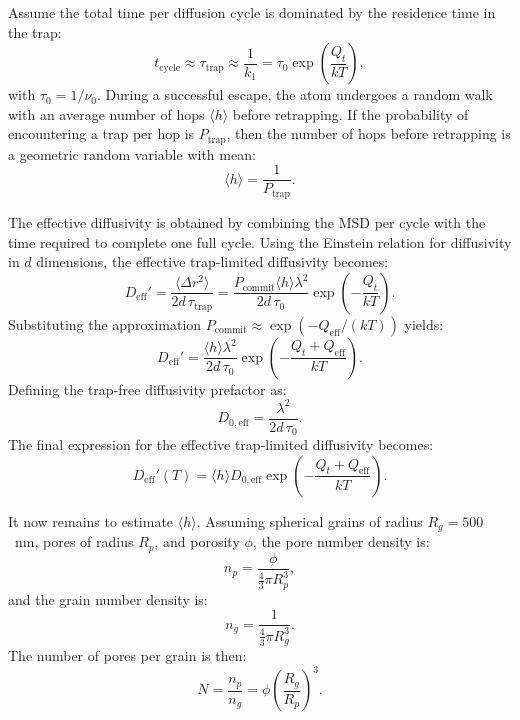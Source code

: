 \documentclass[%
preprint,
amsmath,amssymb,
aps,
]{revtex4-2}
\newcommand{\?}{\stackrel{?}{=}}
\begin{document}
Assume the total time per diffusion cycle is dominated by the residence time in the trap:
\begin{equation}
t_{\text{cycle}} \approx \tau_{\text{trap}} \approx \frac{1}{k_1} = \tau_0 \exp\left( \frac{Q_t}{kT} \right),
\end{equation}
with $\tau_0 = 1/\nu_0$. During a successful escape, the atom undergoes a random walk with an average number of hops $\langle h \rangle$ before retrapping. If the probability of encountering a trap per hop is $P_\text{trap}$, then the number of hops before retrapping is a geometric random variable \cite{Steyer2017} with mean:
\begin{equation}
\langle h \rangle = \frac{1}{P_\text{trap}}.
\end{equation}

The effective diffusivity is obtained by combining the MSD per cycle with the time required to complete one full cycle. Using the Einstein relation for diffusivity in $d$ dimensions, the effective trap-limited diffusivity becomes:
\begin{equation}
D_{\text{eff}}' = \frac{\langle \Delta r^2 \rangle}{2d \, \tau_{\text{trap}}} = \frac{P_{\text{commit}} \langle h \rangle \lambda^2}{2d \, \tau_0} \exp\left( -\frac{Q_t}{kT} \right).
\end{equation}
Substituting the approximation $P_{\text{commit}} \approx \exp(-Q_{\text{eff}} / (kT))$ yields:
\begin{equation}
D_{\text{eff}}' = \frac{\langle h \rangle \lambda^2}{2d \, \tau_0} \exp\left( -\frac{Q_t + Q_{\text{eff}}}{kT} \right).
\end{equation}
Defining the trap-free diffusivity prefactor as:
\begin{equation}
D_{0,\text{eff}} = \frac{\lambda^2}{2d \, \tau_0}.
\end{equation}
The final expression for the effective trap-limited diffusivity becomes:
\begin{equation}
D_{\text{eff}}'(T) = \langle h \rangle D_{0,\text{eff}} \exp\left( -\frac{Q_t + Q_{\text{eff}}}{kT} \right).
\end{equation}

It now remains to estimate $\langle h \rangle$. Assuming spherical grains of radius $R_g = 500$~nm, pores of radius $R_p$, and porosity $\phi$, the pore number density is:
\begin{equation}
n_p = \frac{\phi}{\tfrac{4}{3} \pi R_p^3},
\end{equation}
and the grain number density is:
\begin{equation}
n_g = \frac{1}{\tfrac{4}{3} \pi R_g^3}.
\end{equation}
The number of pores per grain is then:
\begin{equation}
N = \frac{n_p}{n_g} = \phi \left( \frac{R_g}{R_p} \right)^3.
\end{equation}
\end{document}

